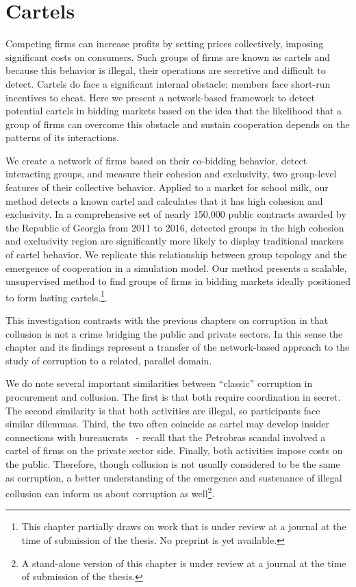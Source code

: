 \chapter{Cartels}


Competing firms can increase profits by setting prices collectively, imposing significant costs on consumers. Such groups of firms are known as cartels and because this behavior is illegal, their operations are secretive and difficult to detect. Cartels do face a significant internal obstacle: members face short-run incentives to cheat. Here we present a network-based framework to detect potential cartels in bidding markets based on the idea that the likelihood that a group of firms can overcome this obstacle and sustain cooperation depends on the patterns of its interactions. 

We create a network of firms based on their co-bidding behavior, detect interacting groups, and measure their cohesion and exclusivity, two group-level features of their collective behavior. Applied to a market for school milk, our method detects a known cartel and calculates that it has high cohesion and exclusivity. In a comprehensive set of nearly 150,000 public contracts awarded by the Republic of Georgia from 2011 to 2016, detected groups in the high cohesion and exclusivity region are significantly more likely to display traditional markers of cartel behavior. We replicate this relationship between group topology and the emergence of cooperation in a simulation model. Our method presents a scalable, unsupervised method to find groups of firms in bidding markets ideally positioned to form lasting cartels.\footnote{This chapter partially draws on work that is under review at a journal at the time of submission of the thesis. No preprint is yet available.}.

This investigation contrasts with the previous chapters on corruption in that collusion is not a crime bridging the public and private sectors. In this sense the chapter and its findings represent a transfer of the network-based approach to the study of corruption to a related, parallel domain. 

We do note several important similarities between ``classic'' corruption in procurement and collusion. The first is that both require coordination in secret. The second similarity is that both activities are illegal, so participants face similar dilemmas. Third, the two often coincide as cartel may develop insider connections with bureaucrats~\cite{luz2017leniency} - recall that the Petrobras scandal involved a cartel of firms on the private sector side. Finally, both activities impose costs on the public. Therefore, though collusion is not usually considered to be the same as corruption, a better understanding of the emergence and sustenance of illegal collusion can inform us about corruption as well\footnote{A stand-alone version of this chapter is under review at a journal at the time of submission of the thesis.}.

